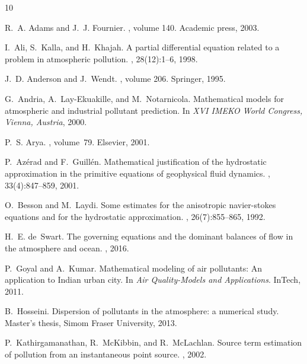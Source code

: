 \documentclass[11pt]{article}
\begin{document}
\nocite{*}


\begin{thebibliography}{10}

R.~A. Adams and J.~J. Fournier.
, volume 140.
\newblock Academic press, 2003.

I.~Ali, S.~Kalla, and H.~Khajah.
\newblock A partial differential equation related to a problem in atmospheric pollution.
, 28(12):1--6, 1998.

J.~D. Anderson and J.~Wendt.
, volume 206.
\newblock Springer, 1995.

G.~Andria, A.~Lay-Ekuakille, and M.~Notarnicola.
\newblock Mathematical models for atmospheric and industrial pollutant prediction.
\newblock In {\em XVI IMEKO World Congress, Vienna, Austria}, 2000.

P.~S. Arya.
, volume~79.
\newblock Elsevier, 2001.

P.~Az{\'e}rad and F.~Guill{\'e}n.
\newblock Mathematical justification of the hydrostatic approximation in the primitive equations of geophysical fluid dynamics.
, 33(4):847--859, 2001.

O.~Besson and M.~Laydi.
\newblock Some estimates for the anisotropic navier-stokes equations and for the hydrostatic approximation.
, 26(7):855--865, 1992.

H.~E. de~Swart.
\newblock The governing equations and the dominant balances of flow in the atmosphere and ocean.
, 2016.

P.~Goyal and A.~Kumar.
\newblock Mathematical modeling of air pollutants: An application to Indian urban city.
\newblock In {\em Air Quality-Models and Applications}. InTech, 2011.

B.~Hosseini.
\newblock Dispersion of pollutants in the atmosphere: a numerical study.
\newblock Master's thesis, Simom Fraser University, 2013.

P.~Kathirgamanathan, R.~McKibbin, and R.~McLachlan.
\newblock Source term estimation of pollution from an instantaneous point source.
, 2002.


\end{thebibliography}
\end{document}
